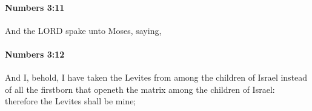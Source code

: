 		\paragraph{Numbers 3:11} %
			\label{NUMBERS-3-11}

			And the LORD spake unto Moses, saying,


		\paragraph{Numbers 3:12} %
			\label{NUMBERS-3-12}

			And I, behold, I have taken the Levites from among the children of Israel instead of all the firstborn that openeth the matrix among the children of Israel: therefore the Levites shall be mine;


